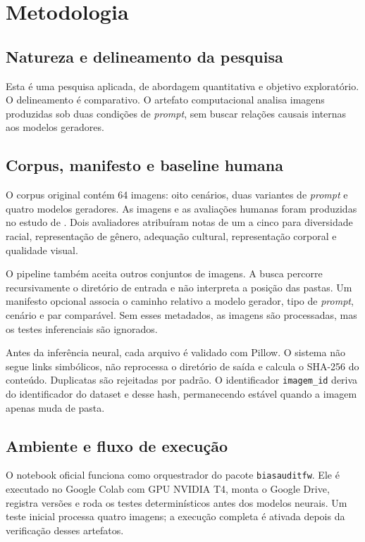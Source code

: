 \chapter{Metodologia}
\label{cap:metodologia}

\section{Natureza e delineamento da pesquisa}

Esta é uma pesquisa aplicada, de abordagem quantitativa e objetivo exploratório. O delineamento é comparativo. O artefato computacional analisa imagens produzidas sob duas condições de \textit{prompt}, sem buscar relações causais internas aos modelos geradores.

\section{Corpus, manifesto e baseline humana}

O corpus original contém 64 imagens: oito cenários, duas variantes de \textit{prompt} e quatro modelos geradores. As imagens e as avaliações humanas foram produzidas no estudo de . Dois avaliadores atribuíram notas de um a cinco para diversidade racial, representação de gênero, adequação cultural, representação corporal e qualidade visual.

O pipeline também aceita outros conjuntos de imagens. A busca percorre recursivamente o diretório de entrada e não interpreta a posição das pastas. Um manifesto opcional associa o caminho relativo a modelo gerador, tipo de \textit{prompt}, cenário e par comparável. Sem esses metadados, as imagens são processadas, mas os testes inferenciais são ignorados.

Antes da inferência neural, cada arquivo é validado com Pillow. O sistema não segue links simbólicos, não reprocessa o diretório de saída e calcula o SHA-256 do conteúdo. Duplicatas são rejeitadas por padrão. O identificador \texttt{imagem\_id} deriva do identificador do dataset e desse hash, permanecendo estável quando a imagem apenas muda de pasta.

\section{Ambiente e fluxo de execução}

O notebook oficial funciona como orquestrador do pacote \texttt{biasauditfw}. Ele é executado no Google Colab com GPU NVIDIA T4, monta o Google Drive, registra versões e roda os testes determinísticos antes dos modelos neurais. Um teste inicial processa quatro imagens; a execução completa é ativada depois da verificação desses artefatos.

